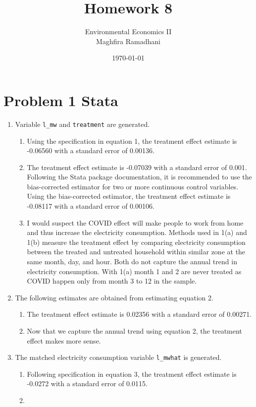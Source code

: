 \documentclass{article}
\begin{document}
 
\title{Homework 8}
\author{Environmental Economics II\\
Maghfira Ramadhani}
\date{\today}
\maketitle

\section*{Problem 1 Stata}
\begin{enumerate}
\item Variable \verb!l_mw! and \verb!treatment! are generated.
\begin{enumerate}
    \item Using the specification in equation 1, the treatment effect estimate is -0.06560 with a standard error of 0.00136.
    \item The treatment effect estimate is -0.07039 with a standard error of 0.001. Following the Stata package documentation, it is recommended to use the bias-corrected estimator for two or more continuous control variables. Using the bias-corrected estimator, the treatment effect estimate is -0.08117 with a standard error of 0.00106. 
    \item I would suspect the COVID effect will make people to work from home and thus increase the electricity consumption. Methods used in 1(a) and 1(b) measure the treatment effect by comparing electricity consumption between the treated and untreated household within similar zone at the same month, day, and hour. Both do not capture the annual trend in electricity consumption. With 1(a) month 1 and 2 are never treated as COVID happen only from month 3 to 12 in the sample.
\end{enumerate}
\item The following estimates are obtained from estimating equation 2.
\begin{enumerate}
    \item The treatment effect estimate is 0.02356 with a standard error of 0.00271.
    \item Now that we capture the annual trend using equation 2, the treatment effect makes more sense.
\end{enumerate}
\item The matched electricity consumption variable \verb!l_mwhat! is generated.
\begin{enumerate}
    \item Following specification in equation 3, the treatment effect estimate is -0.0272 with a standard error of 0.0115.
    \item 
\end{enumerate}    
\end{enumerate}
\end{document}
